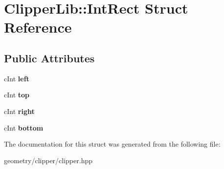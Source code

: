 \hypertarget{struct_clipper_lib_1_1_int_rect}{}\section{Clipper\+Lib\+:\+:Int\+Rect Struct Reference}
\label{struct_clipper_lib_1_1_int_rect}
\subsection*{Public Attributes}
\begin{DoxyCompactItemize}
\item 
\mbox{\label{struct_clipper_lib_1_1_int_rect_a9bf519994ffc7d1d5752fb1e2411b4cd}} 
c\+Int {\bfseries left}
\item 
\mbox{\label{struct_clipper_lib_1_1_int_rect_a07154695bf2313182400f829ba07c3a9}} 
c\+Int {\bfseries top}
\item 
\mbox{\label{struct_clipper_lib_1_1_int_rect_a28c68b5f806a88a187a53f3956954e74}} 
c\+Int {\bfseries right}
\item 
\mbox{\label{struct_clipper_lib_1_1_int_rect_a9da9418de5faa7eba55e8ee98a13ea0e}} 
c\+Int {\bfseries bottom}
\end{DoxyCompactItemize}


The documentation for this struct was generated from the following file\+:\begin{DoxyCompactItemize}
\item 
geometry/clipper/clipper.\+hpp\end{DoxyCompactItemize}
